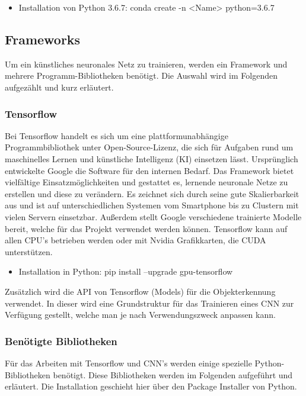 \documentclass[a4paper,12pt,oneside]{article}
\begin{document}
  \begin{itemize}
	\item Installation von Python 3.6.7: conda create -n <Name> python=3.6.7
  \end{itemize}
  
  \subsection{Frameworks}
Um ein künstliches neuronales Netz zu trainieren, werden ein Framework und mehrere Programm-Bibliotheken benötigt. Die Auswahl wird im Folgenden aufgezählt und kurz erläutert.
 
  \subsubsection{Tensorflow}
Bei Tensorflow \cite{google2018tens} handelt es sich um eine plattformunabhängige Programmbibliothek unter Open-Source-Lizenz, die sich für Aufgaben rund um maschinelles Lernen und künstliche Intelligenz (KI) einsetzen lässt. Ursprünglich entwickelte Google die Software für den internen Bedarf. Das Framework bietet vielfältige Einsatzmöglichkeiten und gestattet es, lernende neuronale Netze zu erstellen und diese zu verändern. Es zeichnet sich durch seine gute Skalierbarkeit aus und ist auf unterschiedlichen Systemen vom Smartphone bis zu Clustern mit vielen Servern einsetzbar. Außerdem stellt Google verschiedene trainierte Modelle bereit, welche für das Projekt verwendet werden können. Tensorflow kann auf allen CPU's betrieben werden oder mit Nvidia Grafikkarten, die CUDA unterstützen.

  \begin{itemize}
\item Installation in Python: pip install --upgrade gpu-tensorflow
  \end{itemize}
  
  Zusätzlich wird die API von Tensorflow (Models) für die Objekterkennung verwendet. In dieser wird eine Grundstruktur für das Trainieren eines CNN zur Verfügung gestellt, welche man je nach Verwendungszweck anpassen kann.
  
  \subsubsection{Benötigte Bibliotheken}
Für das Arbeiten mit Tensorflow und CNN's werden einige spezielle Python-Bibliotheken benötigt. Diese Bibliotheken werden im Folgenden aufgeführt und erläutert. Die Installation geschieht hier über den \glqq Package Installer \glqq von Python.
\\
 
\end{document}
